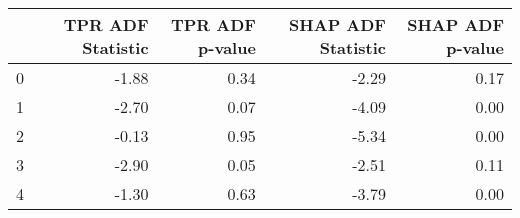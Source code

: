 \begin{tabular}{lrrrr}
\toprule
 & TPR ADF Statistic & TPR ADF p-value & SHAP ADF Statistic & SHAP ADF p-value \\
\midrule
0 & -1.88 & 0.34 & -2.29 & 0.17 \\
1 & -2.70 & 0.07 & -4.09 & 0.00 \\
2 & -0.13 & 0.95 & -5.34 & 0.00 \\
3 & -2.90 & 0.05 & -2.51 & 0.11 \\
4 & -1.30 & 0.63 & -3.79 & 0.00 \\
\bottomrule
\end{tabular}
